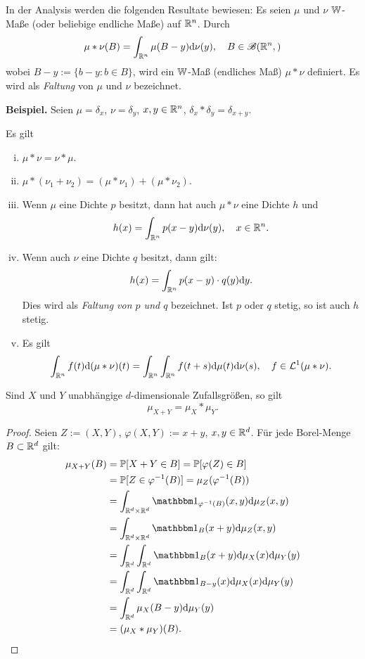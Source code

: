 \begin{rmrk}
  In der Analysis werden die folgenden Resultate bewiesen: Es seien $\mu$ und
  $\nu$ $\mathbb{W}$-Maße (oder beliebige endliche Maße) auf $\mathbb{R}^n$. Durch
  \[ \mu \ast \nu(B) = \int_{\mathbb{R}^n} \mu( B-y ) \mathrm{d} \nu(y), \quad B \in
    \mathscr{B}(\mathbb{R}^n,) \]
  wobei $B-y := \{ b-y : b \in B \}$, wird ein $\mathbb{W}$-Maß (endliches Maß) $\mu
  \ast \nu$ definiert. Es wird als \emph{Faltung} von $\mu$ und $\nu$
  bezeichnet.

  \textbf{Beispiel.} Seien $\mu = \delta_x$, $\nu = \delta_y$, $x,y \in \mathbb{R}^n$, $\delta_x \ast
  \delta_y = \delta_{x+y}$.

  Es gilt
  \begin{enumerate}[(i)]
  \item $\mu \ast \nu = \nu \ast \mu$.
  \item $\mu \ast (\nu_1 + \nu_2) = (\mu \ast \nu_1) + (\mu \ast \nu_2)$.
  \item Wenn $\mu$ eine Dichte $p$ besitzt, dann hat auch $\mu \ast \nu$ eine
    Dichte $h$ und
    \[ h(x) = \int_{\mathbb{R}^n} p(x-y) \mathrm{d} \nu(y), \quad x \in \mathbb{R}^n. \]
  \item Wenn auch $\nu$ eine Dichte $q$ besitzt, dann gilt:
    \[ h(x) = \int_{\mathbb{R}^n} p(x-y) \cdot q(y) \mathrm{d} y. \]
    Dies wird als \emph{Faltung von $p$ und $q$} bezeichnet. Ist $p$ oder $q$
    stetig, so ist auch $h$ stetig.
  \item Es gilt
    \[ \int_{\mathbb{R}^n} f(t) \mathrm{d} (\mu \ast \nu)(t) = \int_{\mathbb{R}^n}
      \int_{\mathbb{R}^n} f(t+s) \mathrm{d} \mu(t) \mathrm{d} \nu(s), \quad f \in
      \mathcal{L}^1(\mu \ast \nu). \]
  \end{enumerate}
\end{rmrk}

\clearpage

\begin{thm}
  Sind $X$ und $Y$ unabhängige $d$-dimensionale Zufallsgrößen, so gilt
  \[ \mu_{X + Y} = \mu_X \ast \mu_Y. \]
\end{thm}

\begin{proof}
  Seien $Z := (X,Y)$, $\varphi(X,Y) := x+y$, $x,y \in \mathbb{R}^d$. Für jede
  Borel-Menge $B \subset \mathbb{R}^d$ gilt:
  \begin{align*}
    \mu_{X+Y}(B)
    &= \pP[X+Y \in B] = \pP[\varphi(Z) \in B]  \\
    &= \pP[ Z \in \varphi^{-1}(B) ] = \mu_Z( \varphi^{-1}(B) ) \\
    &= \int_{\real^d \times \real^d} \ind_{\varphi^{-1}(B)}(x,y) \diffop \mu_Z(x,y) \\
    &= \int_{\real^d \times \real^d} \ind_{B}(x+y) \diffop \mu_Z(x,y) \\
    &= \int_{\real^d} \int_{\real^d} \ind_{B}(x+y) \diffop \mu_X(x) \diffop \mu_Y(y) \\
    &= \int_{\real^d} \int_{\real^d} \ind_{B - y}(x) \diffop \mu_X(x) \diffop \mu_Y(y) \\
    &= \int_{\real^d} \mu_X(B - y) \diffop \mu_Y(y) \\
    &= (\mu_X \ast \mu_Y)(B). \qedhere
  \end{align*}
\end{proof}

